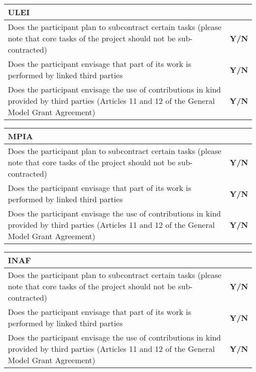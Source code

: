 
\begin{tabular}{|p{}|p{}|}
  \hline  
  \multicolumn{2}{|l|}{\cellcolor[gray]{0.8}\textbf{ULEI}}\\
  \hline
  Does the participant plan to subcontract certain tasks (please note that core tasks of the project should not be sub-contracted) &
  \textbf{Y/N} \\
  \hline
Does the participant envisage that part of its work is performed by linked
third parties &
  \textbf{Y/N} \\
  \hline
  Does the participant envisage the use of contributions in kind provided by
third parties (Articles 11 and 12 of the General Model Grant Agreement) &
  \textbf{Y/N}\\
  \hline
\end{tabular}

\begin{tabular}{|p{}|p{}|}
  \hline  
  \multicolumn{2}{|l|}{\cellcolor[gray]{0.8}\textbf{MPIA}}\\
  \hline
  Does the participant plan to subcontract certain tasks (please note that core tasks of the project should not be sub-contracted) &
  \textbf{Y/N} \\
  \hline
Does the participant envisage that part of its work is performed by linked
third parties &
  \textbf{Y/N} \\
  \hline
  Does the participant envisage the use of contributions in kind provided by
third parties (Articles 11 and 12 of the General Model Grant Agreement) &
  \textbf{Y/N}\\
  \hline
\end{tabular}

\begin{tabular}{|p{}|p{}|}
  \hline  
  \multicolumn{2}{|l|}{\cellcolor[gray]{0.8}\textbf{INAF}}\\
  \hline
  Does the participant plan to subcontract certain tasks (please note that core tasks of the project should not be sub-contracted) &
  \textbf{Y/N} \\
  \hline
Does the participant envisage that part of its work is performed by linked
third parties &
  \textbf{Y/N} \\
  \hline
  Does the participant envisage the use of contributions in kind provided by
third parties (Articles 11 and 12 of the General Model Grant Agreement) &
  \textbf{Y/N}\\
  \hline
\end{tabular}

